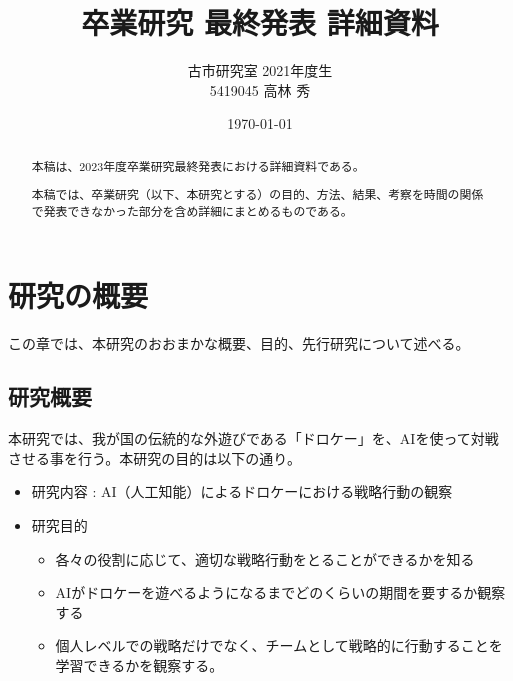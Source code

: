 \documentclass[dvipdfmx]{jsarticle}
\title{卒業研究 最終発表 詳細資料}
\author{古市研究室 2021年度生\\5419045 高林 秀}
\date{\today}
\begin{document}
\maketitle

\begin{abstract}
    本稿は、2023年度卒業研究最終発表における詳細資料である。\par
    本稿では、卒業研究（以下、本研究とする）の目的、方法、結果、考察を時間の関係で発表できなかった部分を含め詳細にまとめるものである。
\end{abstract}
\tableofcontents

\section{研究の概要}
    この章では、本研究のおおまかな概要、目的、先行研究について述べる。
    \subsection{研究概要}
        本研究では、我が国の伝統的な外遊びである「ドロケー」を、AIを使って対戦させる事を行う。本研究の目的は以下の通り。
        \begin{itemize}
            \item 研究内容 : AI（人工知能）によるドロケーにおける戦略行動の観察
            \item 研究目的
                \begin{itemize}
                    \item 各々の役割に応じて、適切な戦略行動をとることができるかを知る
                    \item AIがドロケーを遊べるようになるまでどのくらいの期間を要するか観察する
                    \item 個人レベルでの戦略だけでなく、チームとして戦略的に行動することを学習できるかを観察する。
                \end{itemize}
        \end{itemize}
\end{document}
